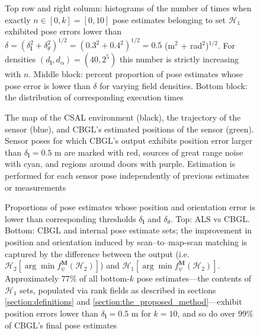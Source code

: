 \begin{figure}
  
  \caption{\small Top row and right column: histograms of the number of times
           when exactly $n \in [0,k] = [0,10]$ pose estimates belonging to set
           $\mathcal{H}_1$ exhibited pose errors lower than $\delta =
           (\delta_{\bm{l}}^2 + \delta_{\theta}^2)^{1/2} =  (0.3^2 +
           0.4^2)^{1/2} = 0.5$ (m$^2$ + rad$^2$)$^{1/2}$. For densities
           $(d_{\bm{l}},d_{\alpha}) = (40, 2^5)$ this number is strictly
           increasing with $n$. Middle block: percent proportion of pose
           estimates whose pose error is lower than $\delta$ for varying field
           densities. Bottom block: the distribution of corresponding execution
           times}
  \label{fig:a:determine_40_32}
\end{figure}


\begin{figure}
  
  \caption{\small The map of the CSAL environment (black), the trajectory of
           the sensor (blue), and CBGL's estimated positions of the sensor
           (green). Sensor poses for which CBGL's output exhibits position error
           larger than $\delta_{\bm{l}} = 0.5$ m are marked with red, sources
           of great range noise with cyan, and regions around doors with
           purple. Estimation is performed for each sensor pose independently
           of previous estimates or measurements}
  \label{fig:a:map_and_trajectory}
\end{figure}

\begin{figure}
  
  \vspace{0.1cm}
  \caption{\small Proportions of pose estimates whose
           position and orientation error is lower than corresponding thresholds
           $\delta_{\bm{l}}$ and $\delta_{\theta}$. Top: ALS vs CBGL. Bottom:
           CBGL and internal pose estimate sets; the improvement in position
           and orientation induced by scan--to--map-scan matching is captured
           by the difference between the output (i.e.
           $\mathcal{H}_2[\arg \min f_{\psi}^{\bm{M}}(\mathcal{H}_2)]$) and
           $\mathcal{H}_1[\arg \min f_{\psi}^{\bm{M}}(\mathcal{H}_2)]$.
           Approximately $77\%$ of all bottom-$k$ pose
           estimates---the contents of $\mathcal{H}_1$ sets, populated via rank
           fields as described in sections \ref{section:definitions} and
           \ref{section:the_proposed_method}---exhibit position errors lower
           than $\delta_{\bm{l}} = 0.5$ m for $k=10$, and so do over $99\%$ of
           CBGL's final pose estimates}
  \label{fig:a:awesomeness}
\end{figure}



